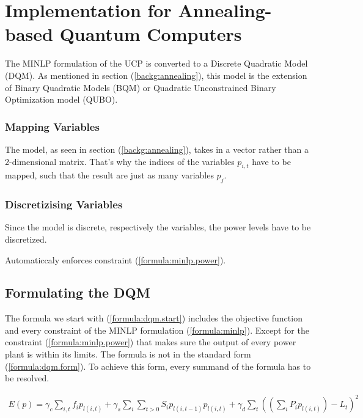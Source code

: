 \section{Implementation for Annealing-based Quantum Computers}

The MINLP formulation of the UCP is converted to a Discrete Quadratic Model (DQM).
As mentioned in section (\ref{backg:annealing}), this model is the extension
of Binary Quadratic Models (BQM) or Quadratic Unconstrained Binary Optimization model (QUBO).

\subsubsection{Mapping Variables}

The model, as seen in section (\ref{backg:annealing}), takes in a vector rather than a 2-dimensional matrix.
That's why the indices of the variables $p_{i,t}$ have to be mapped, such that the result are just as many variables $p_{j}$.


\subsubsection{Discretizising Variables}

Since the model is discrete, respectively the variables, the power levels have to be discretized.


Automaticcaly enforces constraint (\ref{formula:minlp.power}).

\subsection{Formulating the DQM}

The formula we start with (\ref{formula:dqm.start}) includes the objective function and every constraint of the MINLP formulation (\ref{formula:minlp}).
Except for the constraint (\ref{formula:minlp.power}) that makes sure the output of every power plant is within its limits.
The formula is not in the standard form (\ref{formula:dqm.form}).
To achieve this form, every summand of the formula has to be resolved.

\begin{align} \label{formula:dqm.start}
  E(p) = \gamma_c \sum_{i, t} f_i p_{l(i, t)}
  + \gamma_s \sum_i \sum_{t > 0} S_i p_{l(i, t-1)} p_{l(i, t)}
  + \gamma_d \sum_t \left( \left( \sum_i P_i p_{l(i, t)} \right) - L_t \right) ^2
\end{align}

